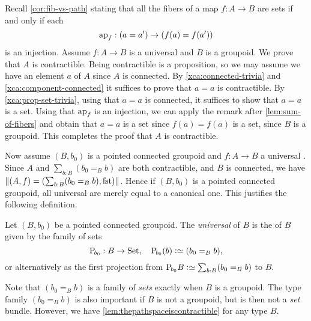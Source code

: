 Recall \cref{cor:fib-vs-path} stating that all the fibers of a map $f:A\to B$ 
are sets if and only if each 
\[
\ap{f}: (a=a')\to (f(a)=f(a'))
\]
is an injection. 
Assume $f:A\to B$ is a universal \covering and $B$ is a groupoid.
We prove that $A$ is contractible. 
Being contractible is a proposition, so we may assume 
we have an element $a$ of $A$ since $A$ is connected. 
By \cref{xca:connected-trivia} and \ref{xca:component-connected} 
it suffices to prove that $a=a$ is contractible.
By \cref{xca:prop-set-trivia}, using that $a=a$ is connected,
it suffices to show that $a=a$ is a set.
Using that $\ap{f}$ is an injection, we can apply the remark after
\cref{lem:sum-of-fibers} and obtain that $a=a$ is a set since
$f(a)=f(a)$ is a set, since $B$ is a groupoid.
This completes the proof that $A$ is contractible.

Now assume $(B,b_0)$ is a pointed connected groupoid and $f:A\to B$
a universal \covering. Since $A$ and $\sum_{b:B}(b_0=_Bb)$ are both
contractible, and $B$ is connected, we have
$\Trunc{(A,f)=(\sum_{b:B}(b_0=_Bb),\fst)}$. 
Hence if $(B,b_0)$ is a pointed connected groupoid, all
universal \coverings are merely equal to a canonical one. 
This justifies the following definition.
\begin{definition}
  \label{def:universalcover}
  Let $(B,b_0)$ be a pointed connected groupoid.  
  The \emph{universal \covering} of $B$
  is the \covering of $B$ given by the family of sets
  \[
    \uc{b_0}:B\to\Set,\quad \uc{b_0}(b)\defequi (b_0=_Bb),
  \]
  or alternatively as the first projection from
  $\uc{b_0}B\defequi\sum_{b:B}(b_0=_Bb)$ to $B$.
\end{definition}
Note that $(b_0=_B b)$ is a family of \emph{sets} exactly when $B$ is a groupoid.
The type family $(b_0=_B b)$ is also important if $B$ is not a groupoid,
but is then not a \emph{set} bundle.
However, we have \cref{lem:thepathspaceiscontractible} for any type $B$.

